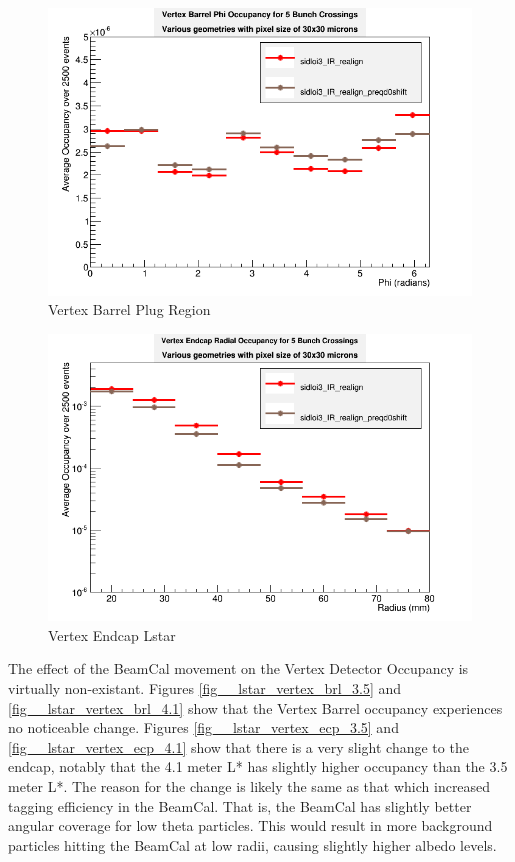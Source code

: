 \documentclass{report}
\begin{document}
                \begin{figure}[H] 
                    \includegraphics[width=\textwidth]{VradOccupancy_Lstar_brl}
                    \centering
                    \caption{Vertex Barrel Plug Region}
                    \label{fig__lstar_vertex_brl}
                \end{figure}
                \begin{figure}[H] 
                    \includegraphics[width=\textwidth]{VradOccupancy_Lstar_ecp}
                    \centering
                    \caption{Vertex Endcap Lstar}
                    \label{fig__lstar_vertex_ecp}
                \end{figure}
                The effect of the BeamCal movement on the Vertex Detector Occupancy is virtually non-existant. Figures \ref{fig__lstar_vertex_brl_3.5} and \ref{fig__lstar_vertex_brl_4.1} show that the Vertex Barrel occupancy experiences no noticeable change. Figures \ref{fig__lstar_vertex_ecp_3.5} and \ref{fig__lstar_vertex_ecp_4.1} show that there is a very slight change to the endcap, notably that the 4.1 meter L* has slightly higher occupancy than the 3.5 meter L*. The reason for the change is likely the same as that which increased tagging efficiency in the BeamCal. That is, the BeamCal has slightly better angular coverage for low theta particles. This would result in more background particles hitting the BeamCal at low radii, causing slightly higher albedo levels.
\end{document}
